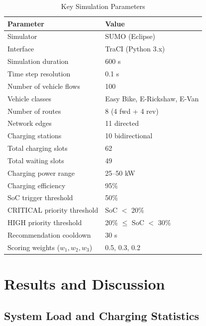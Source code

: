 \documentclass[conference]{IEEEtran}
\begin{document}
\begin{table}[htbp]
\caption{Key Simulation Parameters}
\label{tab:params}
\begin{center}
\begin{tabular}{|l|l|}
\hline
\textbf{Parameter} & \textbf{Value} \\
\hline
Simulator                      & SUMO (Eclipse) \\
\hline
Interface                      & TraCI (Python 3.x) \\
\hline
Simulation duration            & 600 s \\
\hline
Time step resolution           & 0.1 s \\
\hline
Number of vehicle flows        & 100 \\
\hline
Vehicle classes                & Easy Bike, E-Rickshaw, E-Van \\
\hline
Number of routes               & 8 (4 fwd + 4 rev) \\
\hline
Network edges                  & 11 directed \\
\hline
Charging stations              & 10 bidirectional \\
\hline
Total charging slots           & 62 \\
\hline
Total waiting slots            & 49 \\
\hline
Charging power range           & 25--50 kW \\
\hline
Charging efficiency            & 95\% \\
\hline
SoC trigger threshold          & 50\% \\
\hline
CRITICAL priority threshold    & SoC $<$ 20\% \\
\hline
HIGH priority threshold        & 20\% $\leq$ SoC $<$ 30\% \\
\hline
Recommendation cooldown        & 30 s \\
\hline
Scoring weights ($w_1, w_2, w_3$) & 0.5, 0.3, 0.2 \\
\hline
\end{tabular}
\end{center}
\end{table}

\section{Results and Discussion}

\subsection{System Load and Charging Statistics}
\end{document}
